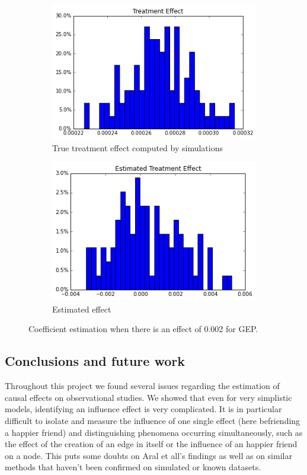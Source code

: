 \documentclass[11pt]{article}
\begin{document}
\begin{figure}[h]
\centering
\begin{subfigure}{.5\textwidth}
  \centering
  \includegraphics[width=.9\linewidth]{treatment_effect_no_influence.png}
  \caption{True treatment effect computed by simulations}
  \label{fig:sub1}
\end{subfigure}%
\begin{subfigure}{.5\textwidth}
  \centering
  \includegraphics[width=.9\linewidth]{estimated_no_influence_gep.png}
  \caption{Estimated effect}
  \label{fig:sub2}
\end{subfigure}
\caption{Coefficient estimation when there is an effect of 0.002 for GEP.}
\label{fig:small_effect_gep}
\end{figure}

\FloatBarrier
\subsection{Conclusions and future work}
Throughout this project we found several issues regarding the estimation of causal effects on observational studies. We showed that even for very simplistic models, identifying an influence effect is very complicated. It is in particular difficult to isolate and measure the influence of one single effect (here befriending a happier friend) and distinguishing phenomena occurring simultaneously, such as the effect of the creation of an edge in itself or the influence of an happier friend on a node. This puts some doubts on Aral et all’s findings as well as on similar methods that haven’t been confirmed on simulated or known datasets. \\
\end{document}
